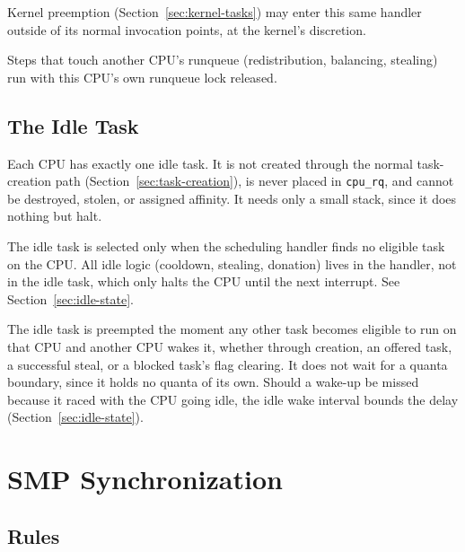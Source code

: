 \documentclass[11pt]{article}
\begin{document}
Kernel preemption (Section~\ref{sec:kernel-tasks}) may enter this same handler outside of its normal invocation points, at the kernel's discretion.

Steps that touch another CPU's runqueue (redistribution, balancing, stealing) run with this CPU's own runqueue lock released.

\subsection{The Idle Task}
\label{sec:idle-task}

Each CPU has exactly one idle task.
It is not created through the normal task-creation path (Section~\ref{sec:task-creation}), is never placed in \texttt{cpu\_rq}, and cannot be destroyed, stolen, or assigned affinity.
It needs only a small stack, since it does nothing but halt.

The idle task is selected only when the scheduling handler finds no eligible task on the CPU.
All idle logic (cooldown, stealing, donation) lives in the handler, not in the idle task, which only halts the CPU until the next interrupt. See Section~\ref{sec:idle-state}.

The idle task is preempted the moment any other task becomes eligible to run on that CPU and another CPU wakes it, whether through creation, an offered task, a successful steal, or a blocked task's flag clearing.
It does not wait for a quanta boundary, since it holds no quanta of its own.
Should a wake-up be missed because it raced with the CPU going idle, the idle wake interval bounds the delay (Section~\ref{sec:idle-state}).

\section{SMP Synchronization}
\label{sec:smp-sync}

\subsection{Rules}
\end{document}
